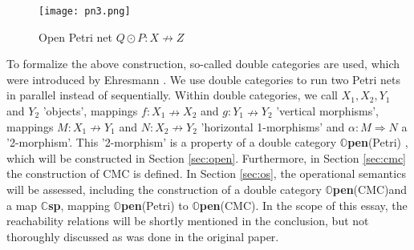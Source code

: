 \documentclass[utf8,british]{cms-essay}
\newcommand{\open}{\textbf{$\mathds{O}$pen}(Petri) }
\newcommand{\cmc}{\textbf{$\mathds{O}$pen}(CMC)}
\newcommand{\csp}{\textbf{$\mathds{C}$sp}}
\begin{document}
\begin{figure}[h!]
    \centering
    \texttt{[image: pn3.png]}
    \caption{Open Petri net $Q \odot P: X \nrightarrow Z$}
    \label{fig:pn3}
\end{figure}
\newpage
To formalize the above construction, so-called double categories are used, which were introduced by Ehresmann \cite{Ehresmann1963,Ehresmann1965}.
We use double categories to run two Petri nets in parallel instead of sequentially. 
Within double categories, we call $X_1, X_2, Y_1$ and $Y_2$ 'objects', mappings $f: X_1 \nrightarrow X_2$ and $g: Y_1 \nrightarrow Y_2$ 'vertical morphisms', mappings $M: X_1 \nrightarrow Y_1$ and $N: X_2 \nrightarrow Y_2$ 'horizontal 1-morphisms' and $\alpha: M \Rightarrow N$ a '2-morphism'.
This '2-morphism' is a property of a double category \open, which will be constructed in Section \ref{sec:open}. Furthermore, in Section \ref{sec:cmc} the construction of CMC is defined. In Section \ref{sec:os}, the operational semantics will be assessed, including the construction of a double category \cmc and a map \csp, mapping \open to \cmc. In the scope of this essay, the reachability relations will be shortly mentioned in the conclusion, but not thoroughly discussed as was done in the original paper.




\end{document}
